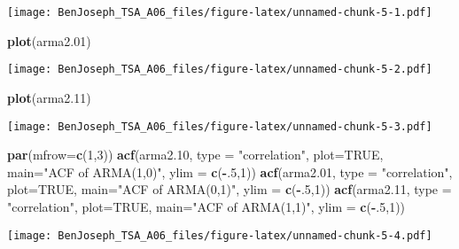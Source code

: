 \documentclass[
]{article}
\newenvironment{Shaded}{\begin{snugshade}}{\end{snugshade}}
\newcommand{\DataTypeTok}[1]{\textcolor[rgb]{0.13,0.29,0.53}{#1}}
\newcommand{\DecValTok}[1]{\textcolor[rgb]{0.00,0.00,0.81}{#1}}
\newcommand{\FloatTok}[1]{\textcolor[rgb]{0.00,0.00,0.81}{#1}}
\newcommand{\KeywordTok}[1]{\textcolor[rgb]{0.13,0.29,0.53}{\textbf{#1}}}
\newcommand{\NormalTok}[1]{#1}
\newcommand{\OperatorTok}[1]{\textcolor[rgb]{0.81,0.36,0.00}{\textbf{#1}}}
\newcommand{\OtherTok}[1]{\textcolor[rgb]{0.56,0.35,0.01}{#1}}
\newcommand{\StringTok}[1]{\textcolor[rgb]{0.31,0.60,0.02}{#1}}
\begin{document}
\texttt{[image: BenJoseph\_TSA\_A06\_files/figure-latex/unnamed-chunk-5-1.pdf]}

\begin{Shaded}
\begin{Highlighting}[]
\KeywordTok{plot}\NormalTok{(arma2}\FloatTok{.01}\NormalTok{)}
\end{Highlighting}
\end{Shaded}

\texttt{[image: BenJoseph\_TSA\_A06\_files/figure-latex/unnamed-chunk-5-2.pdf]}

\begin{Shaded}
\begin{Highlighting}[]
\KeywordTok{plot}\NormalTok{(arma2}\FloatTok{.11}\NormalTok{)}
\end{Highlighting}
\end{Shaded}

\texttt{[image: BenJoseph\_TSA\_A06\_files/figure-latex/unnamed-chunk-5-3.pdf]}

\begin{Shaded}
\begin{Highlighting}[]
\KeywordTok{par}\NormalTok{(}\DataTypeTok{mfrow=}\KeywordTok{c}\NormalTok{(}\DecValTok{1}\NormalTok{,}\DecValTok{3}\NormalTok{))}
\KeywordTok{acf}\NormalTok{(arma2}\FloatTok{.10}\NormalTok{, }\DataTypeTok{type =} \StringTok{"correlation"}\NormalTok{, }\DataTypeTok{plot=}\OtherTok{TRUE}\NormalTok{, }\DataTypeTok{main=}\StringTok{"ACF of ARMA(1,0)"}\NormalTok{, }\DataTypeTok{ylim =} \KeywordTok{c}\NormalTok{(}\OperatorTok{-}\NormalTok{.}\DecValTok{5}\NormalTok{,}\DecValTok{1}\NormalTok{))}
\KeywordTok{acf}\NormalTok{(arma2}\FloatTok{.01}\NormalTok{, }\DataTypeTok{type =} \StringTok{"correlation"}\NormalTok{, }\DataTypeTok{plot=}\OtherTok{TRUE}\NormalTok{, }\DataTypeTok{main=}\StringTok{"ACF of ARMA(0,1)"}\NormalTok{, }\DataTypeTok{ylim =} \KeywordTok{c}\NormalTok{(}\OperatorTok{-}\NormalTok{.}\DecValTok{5}\NormalTok{,}\DecValTok{1}\NormalTok{))}
\KeywordTok{acf}\NormalTok{(arma2}\FloatTok{.11}\NormalTok{, }\DataTypeTok{type =} \StringTok{"correlation"}\NormalTok{, }\DataTypeTok{plot=}\OtherTok{TRUE}\NormalTok{, }\DataTypeTok{main=}\StringTok{"ACF of ARMA(1,1)"}\NormalTok{, }\DataTypeTok{ylim =} \KeywordTok{c}\NormalTok{(}\OperatorTok{-}\NormalTok{.}\DecValTok{5}\NormalTok{,}\DecValTok{1}\NormalTok{))}
\end{Highlighting}
\end{Shaded}

\texttt{[image: BenJoseph\_TSA\_A06\_files/figure-latex/unnamed-chunk-5-4.pdf]}
\end{document}
